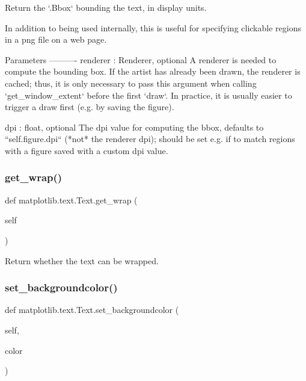 \begin{DoxyVerb}Return the `.Bbox` bounding the text, in display units.

In addition to being used internally, this is useful for specifying
clickable regions in a png file on a web page.

Parameters
----------
renderer : Renderer, optional
    A renderer is needed to compute the bounding box.  If the artist
    has already been drawn, the renderer is cached; thus, it is only
    necessary to pass this argument when calling `get_window_extent`
    before the first `draw`.  In practice, it is usually easier to
    trigger a draw first (e.g. by saving the figure).

dpi : float, optional
    The dpi value for computing the bbox, defaults to
    ``self.figure.dpi`` (*not* the renderer dpi); should be set e.g. if
    to match regions with a figure saved with a custom dpi value.
\end{DoxyVerb}
 \mbox{\label{classmatplotlib_1_1text_1_1Text_aaa6af891d2fb52262c23870d19213efb}} 
\subsubsection{\texorpdfstring{get\+\_\+wrap()}{get\_wrap()}}
{\footnotesize\ttfamily def matplotlib.\+text.\+Text.\+get\+\_\+wrap (\begin{DoxyParamCaption}\item[{}]{self }\end{DoxyParamCaption})}

\begin{DoxyVerb}Return whether the text can be wrapped.\end{DoxyVerb}
 \mbox{\label{classmatplotlib_1_1text_1_1Text_aee3a133f8d5a96f17e4c6e5fbd876364}} 
\subsubsection{\texorpdfstring{set\+\_\+backgroundcolor()}{set\_backgroundcolor()}}
{\footnotesize\ttfamily def matplotlib.\+text.\+Text.\+set\+\_\+backgroundcolor (\begin{DoxyParamCaption}\item[{}]{self,  }\item[{}]{color }\end{DoxyParamCaption})}

